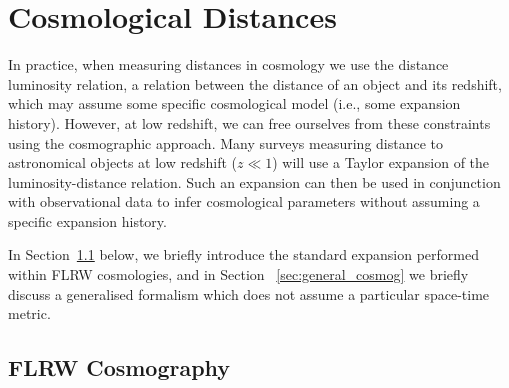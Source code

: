 \documentclass[fleqn,usenatbib]{mnras}
\begin{document}
\section{Cosmological Distances}\label{sec:cosmo_distances}

{In practice, when measuring distances in cosmology we use the distance luminosity relation, a relation between the distance of an object {and its redshift, which may assume some specific} %
cosmological model {(i.e., some expansion history)}. %
{However,} at low redshift, we can free ourselves from these constraints %
using the cosmographic approach. %
{Many} surveys measuring distance to astronomical objects at low redshift ($z\ll 1$) %
{will use a Taylor expansion of} the luminosity-distance relation. 
{Such an expansion can then be used in conjunction with observational data to infer cosmological parameters without assuming a specific expansion history.}}

{In Section~\ref{sec: FLRW_cosmography} below, we briefly introduce the standard expansion performed within FLRW cosmologies, and in Section ~\ref{sec:general_cosmog} we briefly discuss a generalised formalism which does not assume a particular space-time metric.}



\subsection{FLRW Cosmography}
\label{sec: FLRW_cosmography}
\end{document}
